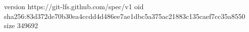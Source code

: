 version https://git-lfs.github.com/spec/v1
oid sha256:83d372de70b30ea4ccdd4d486ee7ae1dbc5a375ac21883c135caef7cc35a8550
size 349692
